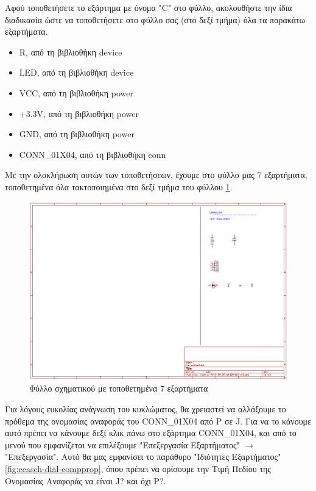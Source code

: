 \documentclass[a4paper]{article}
\begin{document}
Αφού τοποθετήσετε το εξάρτημα με όνομα "C" στο φύλλο, ακολουθήστε την ίδια διαδικασία ώστε να τοποθετήσετε στο φύλλο σας (στο δεξί τμήμα) όλα τα παρακάτω εξαρτήματα. 

\begin{itemize}
    \item R, από τη βιβλιοθήκη device
    \item \textenglish{LED}, από τη βιβλιοθήκη device
    \item VCC, από τη βιβλιοθήκη power
    \item +3.3V, από τη βιβλιοθήκη power
    \item GND, από τη βιβλιοθήκη power
    \item CONN\_01X04, από τη βιβλιοθήκη conn
\end{itemize}

Με την ολοκλήρωση αυτών των τοποθετήσεων, έχουμε στο φύλλο μας 7 εξαρτήματα, τοποθετημένα όλα τακτοποιημένα στο δεξί τμήμα του φύλλου \ref{fig:eesch-circ-placedccomp}.

\begin{figure}
  \begin{center}
    \includegraphics[width=.9\textwidth]{img/eesch-circ-placedccomp.png}
    \caption{Φύλλο σχηματικού με τοποθετημένα 7 εξαρτήματα}
    \label{fig:eesch-circ-placedccomp}
  \end{center}
\end{figure}

Για λόγους ευκολίας ανάγνωση του κυκλώματος, θα χρειαστεί να αλλάξουμε το πρόθεμα της ονομασίας αναφοράς του CONN\_01X04 από P σε J. Για να το κάνουμε αυτό πρέπει να κάνουμε δεξί κλικ πάνω στο εξάρτημα CONN\_01X04, και από το μενού που εμφανίζεται να επιλέξουμε "Επεξεργασία Εξαρτήματος" $\rightarrow$ "Επεξεργασία". Αυτό θα μας εμφανίσει το παράθυρο "Ιδιότητες Εξαρτήματος" \ref{fig:eeasch-dial-compprop}, όπου πρέπει να ορίσουμε την Τιμή Πεδίου της Ονομασίας Αναφοράς να είναι J? και όχι P?.
\end{document}
